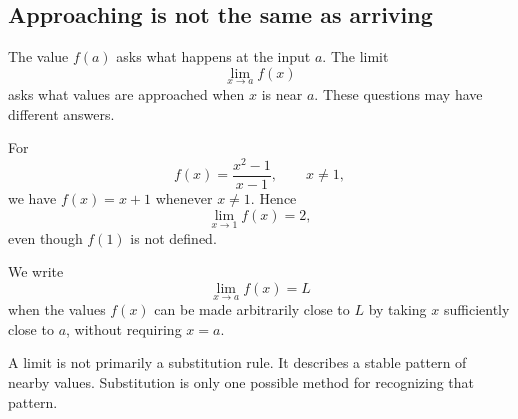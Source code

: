 \subsection{Approaching is not the same as arriving}

\begin{corebox}
The value $f(a)$ asks what happens at the input $a$. The limit
\[
\lim_{x\to a}f(x)
\]
asks what values are approached when $x$ is near $a$. These questions may have different answers.
\end{corebox}

\begin{examplebox}
For
\[
f(x)=\frac{x^2-1}{x-1},\qquad x\ne1,
\]
we have $f(x)=x+1$ whenever $x\ne1$. Hence
\[
\lim_{x\to1}f(x)=2,
\]
even though $f(1)$ is not defined.
\end{examplebox}

\begin{definitionbox}
We write
\[
\lim_{x\to a}f(x)=L
\]
when the values $f(x)$ can be made arbitrarily close to $L$ by taking $x$ sufficiently close to $a$, without requiring $x=a$.
\end{definitionbox}

\begin{interpretationbox}
A limit is not primarily a substitution rule. It describes a stable pattern of nearby values. Substitution is only one possible method for recognizing that pattern.
\end{interpretationbox}

